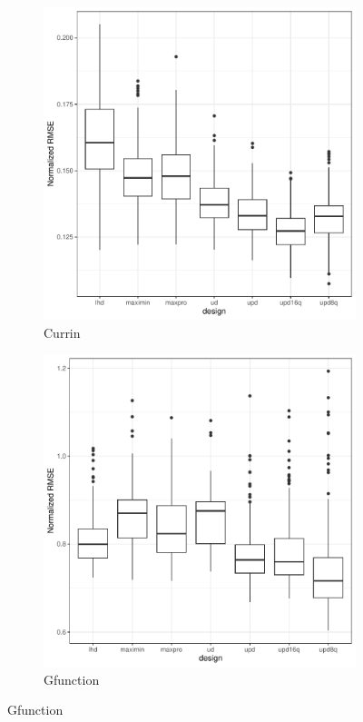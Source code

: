 \documentclass [PhD] {package/uclathes}
\begin{document}
\begin{figure}
\begin{adjustwidth}{-2cm}{-2cm}
\begin{subfigure}[b]{0.35\textwidth}
\end{subfigure}
\begin{subfigure}[b]{0.35\textwidth}
\centering
\caption{Currin}
\includegraphics[width=\textwidth]{chapters/EGO/pdfs/Currin_64x15}
\end{subfigure}
\vfill
\begin{subfigure}[b]{0.35\textwidth}
\centering
\caption{Gfunction}
\includegraphics[width=\textwidth]{chapters/EGO/pdfs/Gfunction_64x15}

\end{subfigure}
\end{adjustwidth}
\end{figure}
\end{document}
